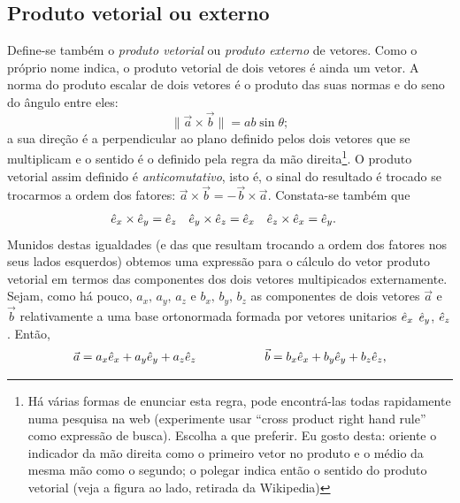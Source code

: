 \subsection*{Produto vetorial ou externo}
Define-se também o \emph{produto vetorial} ou \emph{produto externo} de vetores.
Como o próprio nome indica, o produto vetorial de dois vetores é ainda um
vetor.
A norma do produto escalar de dois vetores é o produto
das suas normas e do seno do ângulo entre eles:
\begin{equation}
  \|\vec a\times\vec b\|=ab\sin\theta;
\end{equation}
a sua direção é a perpendicular ao plano definido pelos dois vetores que se
multiplicam e o sentido é o definido pela regra da mão direita\footnote{%
  \parbox[t]{0.8\textwidth}{Há várias formas de enunciar esta regra, pode
    encontrá-las todas rapidamente numa pesquisa na web (experimente usar
    ``cross product right hand rule'' como expressão de busca). Escolha a que
    preferir. Eu gosto desta: oriente o indicador da mão direita como o primeiro
    vetor no produto e o médio da mesma mão como o segundo; o polegar indica
  então o sentido do produto vetorial (veja a figura ao lado, retirada da
  Wikipedia)}\hfill
  \parbox[t]{1.8cm}{%
  }
}.
O produto vetorial assim definido é \emph{anticomutativo}, isto é, o sinal do
resultado é trocado se trocarmos a ordem dos fatores: $\vec a\times\vec b=-\vec
b\times\vec a$. Constata-se também que
\begin{align}
  \hat e_x\times\hat e_y&=\hat e_z&
  \hat e_y\times\hat e_z&=\hat e_x&
  \hat e_z\times\hat e_x&=\hat e_y.
\end{align}
Munidos destas igualdades (e das que resultam trocando a ordem dos fatores nos
seus lados esquerdos) obtemos uma expressão para o cálculo do vetor produto
vetorial em termos das componentes dos dois vetores multipicados externamente.
Sejam, como há pouco, $a_x,\,a_y,\,a_z$ e $b_x,\,b_y,\,b_z$ as componentes de
dois vetores $\vec a $ e $\vec b$ relativamente a uma base ortonormada formada
por vetores unitarios $\hat e_x$ $\hat e_y$, $\hat e_z$. Então,
\begin{equation*}
  \vec a = a_x\he_x+a_y\he_y+a_z\he_z\rule{2cm}{0mm}
  \vec b = b_x\he_x+b_y\he_y+b_z\he_z,
\end{equation*}
